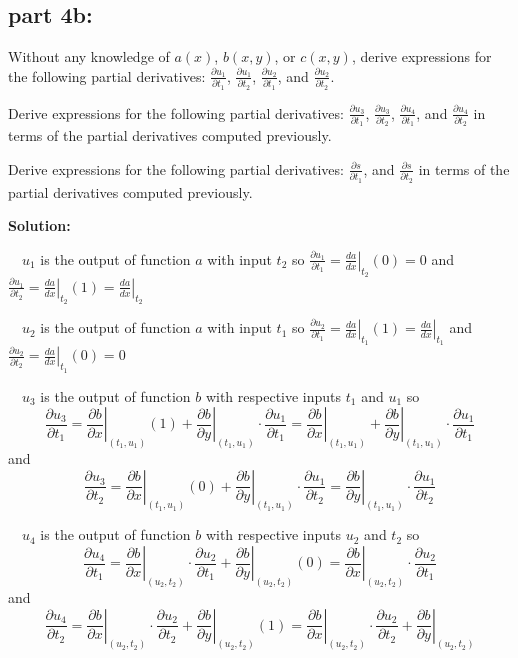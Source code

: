 \documentclass{article}
\newcommand{\at}[1]{\left. #1 \right|}
\newcommand{\diff}[2]{\frac{d #1}{d #2}}
\newcommand{\partdiff}[2]{\frac{\partial #1}{\partial #2}}
\newcommand{\dr}[1]{\textcolor{dark_red}{#1}}
\begin{document}
\subsection*{part 4b:}

Without any knowledge of \(a(x)\), \(b(x,y)\), or \(c(x,y)\), derive expressions for the following partial derivatives: \(\partdiff{u_1}{t_1}\), \(\partdiff{u_1}{t_2}\), \(\partdiff{u_2}{t_1}\), and \(\partdiff{u_2}{t_2}\).

Derive expressions for the following partial derivatives: \(\partdiff{u_3}{t_1}\), \(\partdiff{u_3}{t_2}\), \(\partdiff{u_4}{t_1}\), and \(\partdiff{u_4}{t_2}\) in terms of the partial derivatives computed previously.

Derive expressions for the following partial derivatives: \(\partdiff{s}{t_1}\), and \(\partdiff{s}{t_2}\) in terms of the partial derivatives computed previously.

\vspace{0.5cm}

\dr{\bf Solution:}

\vspace{0.5cm}

\dr{~~\(u_1\) is the output of function \(a\) with input \(t_2\) so \(\partdiff{u_1}{t_1} = \at{\diff{a}{x}}_{t_2}(0) = 0\) and \(\partdiff{u_1}{t_2} = \at{\diff{a}{x}}_{t_2}(1) = \at{\diff{a}{x}}_{t_2}\)}

\dr{~~\(u_2\) is the output of function \(a\) with input \(t_1\) so \(\partdiff{u_2}{t_1} = \at{\diff{a}{x}}_{t_1}(1) = \at{\diff{a}{x}}_{t_1}\) and \(\partdiff{u_2}{t_2} = \at{\diff{a}{x}}_{t_1}(0) = 0\)}

\dr{~~\(u_3\) is the output of function \(b\) with respective inputs \(t_1\) and \(u_1\) so 
\[\partdiff{u_3}{t_1} = \at{\partdiff{b}{x}}_{(t_1,u_1)}(1) + \at{\partdiff{b}{y}}_{(t_1,u_1)}\cdot\partdiff{u_1}{t_1} = \at{\partdiff{b}{x}}_{(t_1,u_1)} + \at{\partdiff{b}{y}}_{(t_1,u_1)}\cdot\partdiff{u_1}{t_1}\] and 
\[\partdiff{u_3}{t_2} = \at{\partdiff{b}{x}}_{(t_1,u_1)}(0) + \at{\partdiff{b}{y}}_{(t_1,u_1)}\cdot\partdiff{u_1}{t_2} = \at{\partdiff{b}{y}}_{(t_1,u_1)}\cdot\partdiff{u_1}{t_2}\]}

\dr{~~\(u_4\) is the output of function \(b\) with respective inputs \(u_2\) and \(t_2\) so 
\[\frac{\partial u_4}{\partial t_1} = \at{\frac{\partial b}{\partial x}}_{(u_2,t_2)}\cdot\frac{\partial u_2}{\partial t_1} + \at{\frac{\partial b}{\partial y}}_{(u_2,t_2)}(0) = \at{\frac{\partial b}{\partial x}}_{(u_2,t_2)}\cdot\frac{\partial u_2}{\partial t_1}\] and 
\[\frac{\partial u_4}{\partial t_2} = \at{\frac{\partial b}{\partial x}}_{(u_2,t_2)}\cdot\frac{\partial u_2}{\partial t_2} + \at{\frac{\partial b}{\partial y}}_{(u_2,t_2)}(1) = \at{\frac{\partial b}{\partial x}}_{(u_2,t_2)}\cdot\frac{\partial u_2}{\partial t_2} + \at{\frac{\partial b}{\partial y}}_{(u_2,t_2)}\]}
\end{document}
